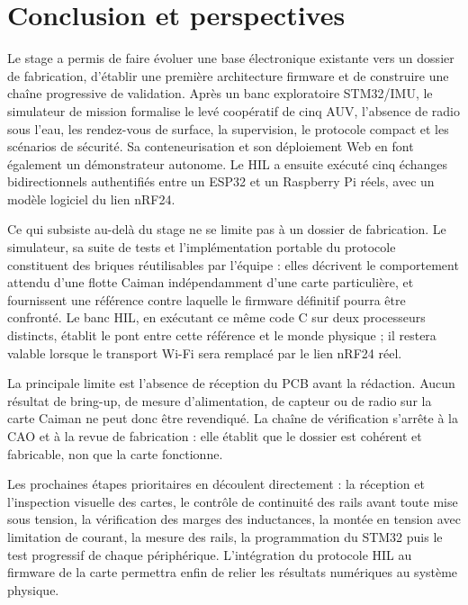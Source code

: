 \chapter{Conclusion et perspectives}
\label{chap:conclusion}

Le stage a permis de faire évoluer une base électronique existante vers un dossier de fabrication, d'établir une première architecture firmware et de construire une chaîne progressive de validation. Après un banc exploratoire STM32/IMU, le simulateur de mission formalise le levé coopératif de cinq AUV, l'absence de radio sous l'eau, les rendez-vous de surface, la supervision, le protocole compact et les scénarios de sécurité. Sa conteneurisation et son déploiement Web en font également un démonstrateur autonome. Le HIL a ensuite exécuté cinq échanges bidirectionnels authentifiés entre un ESP32 et un Raspberry Pi réels, avec un modèle logiciel du lien nRF24.

Ce qui subsiste au-delà du stage ne se limite pas à un dossier de fabrication. Le simulateur, sa suite de tests et l'implémentation portable du protocole constituent des briques réutilisables par l'équipe : elles décrivent le comportement attendu d'une flotte Caiman indépendamment d'une carte particulière, et fournissent une référence contre laquelle le firmware définitif pourra être confronté. Le banc HIL, en exécutant ce même code C sur deux processeurs distincts, établit le pont entre cette référence et le monde physique ; il restera valable lorsque le transport Wi-Fi sera remplacé par le lien nRF24 réel.

La principale limite est l'absence de réception du PCB avant la rédaction. Aucun résultat de bring-up, de mesure d'alimentation, de capteur ou de radio sur la carte Caiman ne peut donc être revendiqué. La chaîne de vérification s'arrête à la CAO et à la revue de fabrication : elle établit que le dossier est cohérent et fabricable, non que la carte fonctionne.

Les prochaines étapes prioritaires en découlent directement : la réception et l'inspection visuelle des cartes, le contrôle de continuité des rails avant toute mise sous tension, la vérification des marges des inductances, la montée en tension avec limitation de courant, la mesure des rails, la programmation du STM32 puis le test progressif de chaque périphérique. L'intégration du protocole HIL au firmware de la carte permettra enfin de relier les résultats numériques au système physique.
